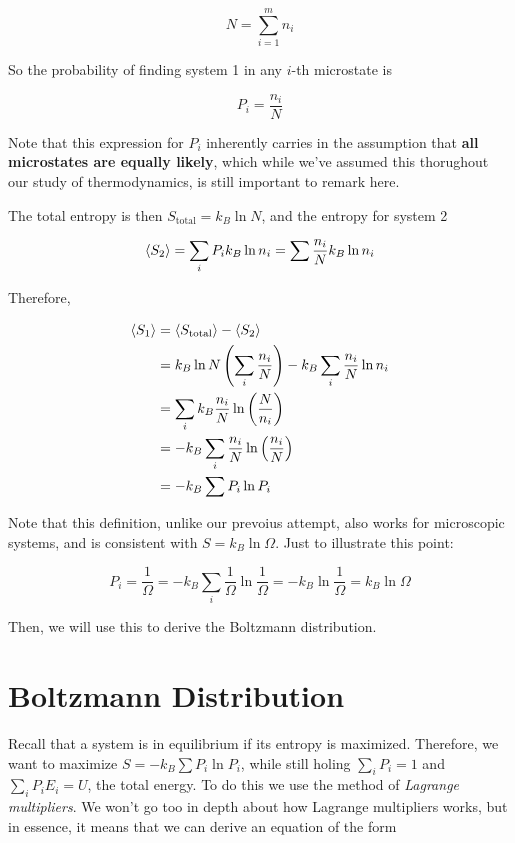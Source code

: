 \[ N = \sum_{i = 1}^m n_i\]

So the probability of finding system 1 in any $i$-th microstate is

\[ P_i = \frac{n_i}{N}\] 

\begin{insight*}{}
    Note that this expression for $P_i$ inherently carries in the assumption that \textbf{all microstates are equally likely}, which while we've assumed this thorughout our study of thermodynamics, is still important to remark here.
\end{insight*}

The total entropy is then $S_{\text{total}} = k_B \ln N$, and the entropy for system 2

\[ \langle S_2 \rangle = \sum_i P_i k_B \ln n_i = \sum \frac{n_i}{N} k_B \ln n_i\] 

Therefore, 

\begin{align*}
    \langle S_1 \rangle &= \langle S_{\text{total}} \rangle - \langle S_2 \rangle\\
    &= k_B \ln N \left(\sum_i \frac{n_i}{N}\right) - k_B \sum_i \frac{n_i}{N} \ln n_i\\
    &= \sum_i k_B \frac{n_i}{N} \ln \left(\frac{N}{n_i}\right)\\
    &= -k_B \sum_i \frac{n_i}{N} \ln \left(\frac{n_i}{N}\right)\\
    &= -k_B \sum P_i \ln P_i
\end{align*}

Note that this definition, unlike our prevoius attempt, also works for microscopic systems, and is consistent with $S = k_B \ln \Omega$. Just to illustrate this point: 

\[ P_i = \frac{1}{\Omega} = -k_B \sum_i \frac{1}{\Omega} \ln \frac{1}{\Omega} = -k_B \ln \frac{1}{\Omega} = k_B \ln \Omega\] 

Then, we will use this to derive the Boltzmann distribution. 

\section{Boltzmann Distribution} 

Recall that a system is in equilibrium if its entropy is maximized. Therefore, we want to maximize $S = -k_B \sum P_i \ln P_i$, while still holing $\sum_i P_i = 1$ and $\sum_i P_i E_i = U$, the total energy. To do this we use the method of \textit{Lagrange multipliers}. We won't go too in depth about how Lagrange multipliers works, but in essence, it means that we can derive an equation of the form

